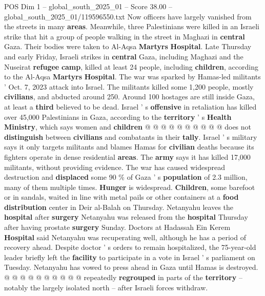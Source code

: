 \begin{textsample}{POS Dim 1 – global\_south\_2025\_01 – Score 38.00 – global\_south\_2025\_01/119596550.txt}
Now officers have largely vanished from the streets in many \textbf{areas}.
Meanwhile, three Palestinians were killed in an Israeli strike that hit a group of people walking in the street in Maghazi in \textbf{central} Gaza.
Their bodies were taken to Al-Aqsa \textbf{Martyrs} \textbf{Hospital}.
Late Thursday and early Friday, Israeli strikes in \textbf{central} Gaza, including Maghazi and the Nuseirat \textbf{refugee} \textbf{camp}, killed at least 24 people, including \textbf{children}, according to the Al-Aqsa \textbf{Martyrs} \textbf{Hospital}.
The war was sparked by Hamas-led militants ' Oct. 7, 2023 attack into Israel.
The militants killed some 1,200 people, mostly \textbf{civilians}, and abducted around 250.
Around 100 hostages are still inside Gaza, at least a \textbf{third} believed to be dead.
Israel ' s \textbf{offensive} in retaliation has killed over 45,000 Palestinians in Gaza, according to the \textbf{territory} ' s \textbf{Health} \textbf{Ministry}, which says women and \textbf{children} @ @ @ @ @ @ @ @ @ @ does not \textbf{distinguish} between \textbf{civilians} and combatants in their \textbf{tally}.
Israel ' s military says it only targets militants and blames Hamas for \textbf{civilian} deaths because its fighters operate in dense residential \textbf{areas}.
The \textbf{army} says it has killed 17,000 militants, without providing evidence.
The war has caused widespread destruction and \textbf{displaced} some 90 \% of Gaza ' s \textbf{population} of 2.3 million, many of them multiple times. \textbf{Hunger} is widespread. \textbf{Children}, some barefoot or in sandals, waited in line with metal pails or other containers at a \textbf{food} \textbf{distribution} center in Deir al-Balah on Thursday.
Netanyahu leaves the \textbf{hospital} after \textbf{surgery} Netanyahu was released from the \textbf{hospital} Thursday after having prostate \textbf{surgery} Sunday.
Doctors at Hadassah Ein Kerem \textbf{Hospital} said Netanyahu was recuperating well, although he has a period of recovery ahead.
Despite doctor ' s orders to remain hospitalized, the 75-year-old leader briefly left the \textbf{facility} to participate in a vote in Israel ' s parliament on Tuesday.
Netanyahu has vowed to press ahead in Gaza until Hamas is destroyed. @ @ @ @ @ @ @ @ @ @ repeatedly \textbf{regrouped} in parts of the \textbf{territory} -- notably the largely isolated north -- after Israeli forces withdraw.

\end{textsample}
